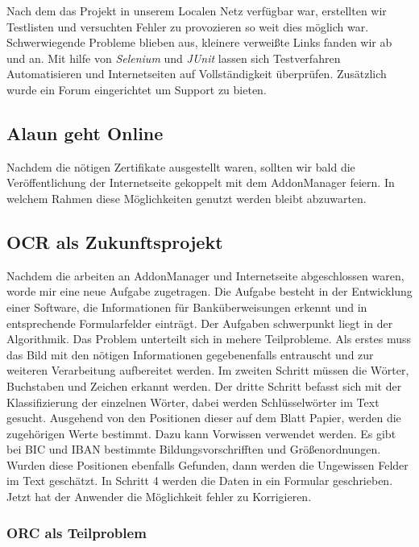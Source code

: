 \documentclass[12pt]{article}
\begin{document}
Nach dem das Projekt in unserem Localen Netz verfügbar war, erstellten wir Testlisten und versuchten Fehler zu provozieren so weit dies möglich war.
Schwerwiegende Probleme blieben aus, kleinere verweißte Links fanden wir ab und an. Mit hilfe von \textit{Selenium} und \textit{JUnit} lassen sich
Testverfahren Automatisieren und Internetseiten auf Vollständigkeit überprüfen. Zusätzlich wurde ein Forum eingerichtet um Support zu bieten.


\subsection{Alaun geht Online}

Nachdem die nötigen Zertifikate ausgestellt waren, sollten wir bald die Veröffentlichung der Internetseite gekoppelt mit dem AddonManager feiern.
In welchem Rahmen diese Möglichkeiten genutzt werden bleibt abzuwarten.

\subsection{OCR als Zukunftsprojekt}

Nachdem die arbeiten an AddonManager und Internetseite abgeschlossen waren, worde mir eine neue Aufgabe zugetragen.
Die Aufgabe besteht in der Entwicklung einer Software, die Informationen für Banküberweisungen erkennt und in
entsprechende Formularfelder einträgt.
Der Aufgaben schwerpunkt liegt in der Algorithmik. Das Problem unterteilt sich in mehere Teilprobleme.
Als erstes muss das Bild mit den nötigen Informationen gegebenenfalls entrauscht und zur weiteren Verarbeitung
aufbereitet werden. Im zweiten Schritt müssen die Wörter, Buchstaben und Zeichen erkannt werden. Der dritte
Schritt befasst sich mit der Klassifizierung der einzelnen Wörter, dabei werden Schlüsselwörter im Text gesucht.
Ausgehend von den Positionen dieser auf dem Blatt Papier, werden die zugehörigen Werte bestimmt.
Dazu kann Vorwissen verwendet werden. Es gibt bei BIC und IBAN bestimmte Bildungsvorschrifften und Größenordnungen.
Wurden diese Positionen ebenfalls Gefunden, dann werden die Ungewissen Felder im Text geschätzt.
In Schritt 4 werden die Daten in ein Formular geschrieben. Jetzt hat der Anwender die Möglichkeit fehler zu Korrigieren.

\subsubsection{ORC als Teilproblem}
\end{document}
